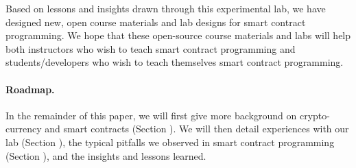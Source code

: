 \documentclass[10pt,twocolumn,letterpaper]{article}
\newcommand{\elaine}[1]{{\color{red}{[elaine: #1]}}}
\newcommand{\ignore}[1]{}
\begin{document}
Based on lessons and insights 
drawn through this experimental lab, we have designed
new, open course materials and lab designs 
for smart contract programming.
\elaine{cite anonymously}
We hope that these open-source course materials and labs
will help both instructors who 
wish to teach smart contract programming and students/developers who 
wish to teach themselves smart contract programming.
\elaine{probably the langugage can be better.}

\paragraph{Roadmap.}
In the remainder of this paper, we will first give more background on 
crypto-currency and smart contracts (Section \elaine{refer}). 
We will then detail experiences with our lab (Section \elaine{refer}),  
the typical pitfalls we observed in smart  
contract programming (Section \elaine{refer}), 
and the insights and lessons learned. 



\ignore{
Smart contract design also requires economic thinking. We use a running example about a rock-paper-scissors game. To help keep incentives in focus, we reward the winner with a monetary prize, so both participants have a stake in the outcome.  Other, more clearly “useful” application include derivative financial instruments, for example that allow people to buy or sell insurance against events that can be “logged” by the network, such as the price of another cryptocurrency. Smart contracts can also be used to raise “crowdfunding” money with a Kickstarter-like assurance contract, that gives contributors a refund if a donations target isn’t reached. In all of these applications, we will want to guarantee that the smart contracts are ``fair'' and aren't profitable to exploit.
}
\end{document}
